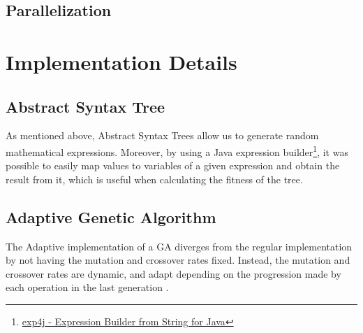 \documentclass[runningheads]{llncs}
\begin{document}
\subsection{Parallelization}

\section{Implementation Details}

\subsection{Abstract Syntax Tree}

As mentioned above, Abstract Syntax Trees allow us to generate random mathematical expressions. Moreover, by using a Java expression builder\footnote{\href{https://www.objecthunter.net/exp4j/index.htm}{exp4j - Expression Builder from String for Java}}, it was possible to easily map values to variables of a given expression and obtain the result from it, which is useful when calculating the fitness of the tree.
%
%
%
%

\subsection{Adaptive Genetic Algorithm}
The Adaptive implementation of a GA diverges from the regular implementation by not having the mutation and crossover rates fixed. Instead, the mutation and crossover rates are dynamic, and adapt depending on the progression made by each operation in the last generation \cite{adaptativeCrossOverMutation}.
\end{document}
